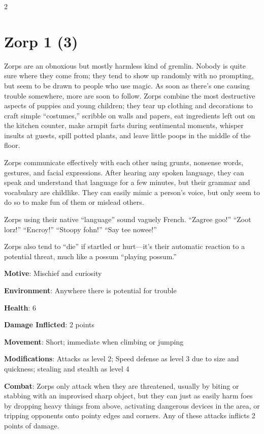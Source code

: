\begin{multicols}{2}
\section{Zorp 1 (3)}

Zorps are an obnoxious but mostly harmless kind of gremlin. Nobody is quite sure where they come from; they tend to show up randomly with no prompting, but seem to be drawn to people who use magic. As soon as there’s one causing trouble somewhere, more are soon to follow. Zorps combine the most destructive aspects of puppies and young children; they tear up clothing and decorations to craft simple “costumes,” scribble on walls and papers, eat ingredients left out on the kitchen counter, make armpit farts during sentimental moments, whisper insults at guests, spill potted plants, and leave little poops in the middle of the floor. 

Zorps communicate effectively with each other using grunts, nonsense words, gestures, and facial expressions. After hearing any spoken language, they can speak and understand that language for a few minutes, but their grammar and vocabulary are childlike. They can easily mimic a person’s voice, but only seem to do so to make fun of them or mislead others.

Zorps using their native “language” sound vaguely French. “Zagree goo!” “Zoot lorz!” “Encroy!” “Stoopy fohn!” “Say tee nowee!”

Zorps also tend to “die” if startled or hurt—it’s their automatic reaction to a potential threat, much like a possum “playing possum.”

\textbf{Motive}: Mischief and curiosity 

\textbf{Environment}: Anywhere there is potential for trouble 

\textbf{Health}: 6 

\textbf{Damage Inflicted}: 2 points 

\textbf{Movement}: Short; immediate when climbing or jumping 

\textbf{Modifications}: Attacks as level 2; Speed defense as level 3 due to size and quickness; stealing and stealth as level 4 

\textbf{Combat}: Zorps only attack when they are threatened, usually by biting or stabbing with an improvised sharp object, but they can just as easily harm foes by dropping heavy things from above, activating dangerous devices in the area, or tripping opponents onto pointy edges and corners. Any of these attacks inflicts 2 points of damage. 


\end{multicols}
